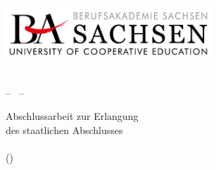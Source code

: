 \thispagestyle{empty}
\begin{titlepage}


	\vspace{1cm}
	\begin{center}
		\includegraphics[width=7.7cm]{figures/CD/logo_basn} \\ 
	\end{center}

	\begin{center}
		\vspace{0.1cm}
		\huge \textbf{\myAcademy}\\
		\vspace{0.4cm}
		\LARGE -- \myStudy\ --
	\end{center}

	\vfill


	\vfill

	\begin{center}
		\LARGE \textbf{\myTitle}
		\ifdef{\mySubtitle}{\vspace{0.2cm}\\ \large \mySubtitle}{}
	\end{center} 

	\vfill
	\vfill

	\begin{center}
		\Large Abschlussarbeit zur Erlangung\\des staatlichen Abschlusses\\
		\vspace{0.3cm}
		\Large\myDegree\\
		\small(\myDegreeShort)
	\end{center}


\end{titlepage}
